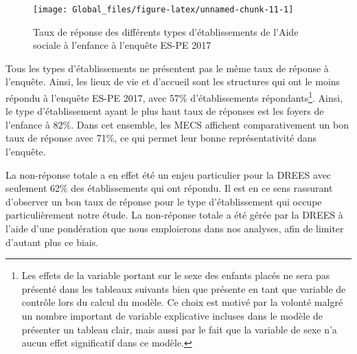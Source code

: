 \documentclass[
  12,
  a4paper,
]{report}
\begin{document}
\begin{figure}

{\centering \texttt{[image: Global\_files/figure-latex/unnamed-chunk-11-1]} 

}

\caption{Taux de réponse des différents types d'établissements de l'Aide sociale à l'enfance à l'enquête ES-PE 2017}\label{fig:unnamed-chunk-11}
\end{figure}

Tous les types d'établissements ne présentent pas le même taux de
réponse à l'enquête. Ainsi, les lieux de vie et d'accueil sont les
structures qui ont le moins répondu à l'enquête ES-PE 2017, avec 57\%
d'établissements répondants\footnote{Les effets de la variable portant
  sur le sexe des enfants placés ne sera pas présenté dans les tableaux
  suivants bien que présente en tant que variable de contrôle lors du
  calcul du modèle. Ce choix est motivé par la volonté malgré un nombre
  important de variable explicative incluses dans le modèle de présenter
  un tableau clair, mais aussi par le fait que la variable de sexe n'a
  aucun effet significatif dans ce modèle.}. Ainsi, le type
d'établissement ayant le plus haut taux de réponses est les foyers de
l'enfance à 82\%. Dans cet ensemble, les MECS affichent comparativement
un bon taux de réponse avec 71\%, ce qui permet leur bonne
représentativité dans l'enquête.

La non-réponse totale a en effet été un enjeu particulier pour la DREES
avec seulement 62\% des établissements qui ont répondu. Il est en ce
sens rassurant d'observer un bon taux de réponse pour le type
d'établissement qui occupe particulièrement notre étude. La non-réponse
totale a été gérée par la DREES à l'aide d'une pondération que nous
emploierons dans nos analyses, afin de limiter d'autant plus ce biais.
\end{document}
